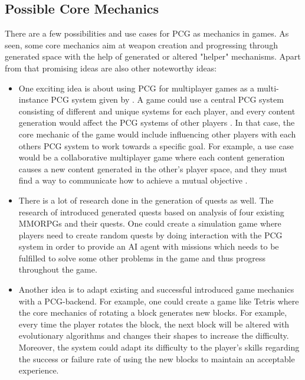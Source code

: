 \documentclass[MGS,Master,english]{twbook}%
\begin{document}
\subsection{Possible Core Mechanics}
There are a few possibilities and use cases for PCG as mechanics in games. As seen, some core mechanics aim at weapon creation and progressing through generated space with the help of generated or altered "helper" mechanisms. Apart from that promising ideas are also other noteworthy ideas:
\begin{itemize}
	\item One exciting idea is about using PCG for multiplayer games as a multi-instance PCG system given by \citep{pcg::futureOfPcgInGames}. A game could use a central PCG system consisting of different and unique systems for each player, and every content generation would affect the PCG systems of other players \cite{pcg::futureOfPcgInGames}.  In that case, the core mechanic of the game would include influencing other players with each others PCG system to work towards a specific goal. For example, a use case would be a collaborative multiplayer game where each content generation causes a new content generated in the other’s player space, and they must find a way to communicate how to achieve a mutual objective \cite{pcg::futureOfPcgInGames}. 
	\item There is a lot of research done in the generation of quests as well. The research of \citep{pcg::questGenerator} introduced generated quests based on analysis of four existing \acp{MMORPG} and their quests. One could create a simulation game where players need to create random quests by doing interaction with the PCG system in order to provide an AI agent with missions which needs to be fulfilled to solve some other problems in the game and thus progress throughout the game.
	\item Another idea is to adapt existing and successful introduced game mechanics with a PCG-backend. For example, one could create a game like Tetris where the core mechanics of rotating a block generates new blocks. For example, every time the player rotates the block, the next block will be altered with evolutionary algorithms and changes their shapes to increase the difficulty. Moreover, the system could adapt its difficulty to the player's skills regarding the success or failure rate of using the new blocks to maintain an acceptable experience.
\end{itemize} 

%
%
\clearpage
\end{document}
